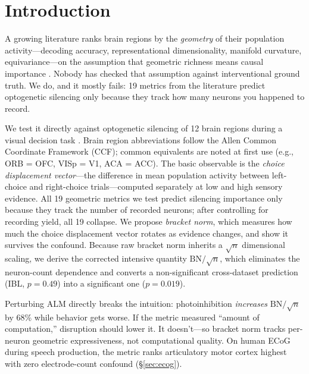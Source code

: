 \documentclass{article}
\begin{document}
\section{Introduction}

A growing literature ranks brain regions by the \emph{geometry} of their population activity---decoding accuracy, representational dimensionality, manifold curvature, equivariance---on the assumption that geometric richness means causal importance \citep{cunningham2014dimensionality, gallego2017neural}. Nobody has checked that assumption against interventional ground truth. We do, and it mostly fails: 19 metrics from the literature predict optogenetic silencing only because they track how many neurons you happened to record.

We test it directly against optogenetic silencing of 12 brain regions during a visual decision task \citep{steinmetz2019distributed, zatkahaas2021}. Brain region abbreviations follow the Allen Common Coordinate Framework (CCF); common equivalents are noted at first use (e.g., ORB = OFC, VISp = V1, ACA = ACC). The basic observable is the \emph{choice displacement vector}---the difference in mean population activity between left-choice and right-choice trials---computed separately at low and high sensory evidence. All 19 geometric metrics we test predict silencing importance only because they track the number of recorded neurons; after controlling for recording yield, all 19 collapse. We propose \emph{bracket norm}, which measures how much the choice displacement vector rotates as evidence changes, and show it survives the confound. Because raw bracket norm inherits a $\sqrt{n}$ dimensional scaling, we derive the corrected intensive quantity $\text{BN}/\!\sqrt{n}$, which eliminates the neuron-count dependence and converts a non-significant cross-dataset prediction (IBL, $p = 0.49$) into a significant one ($p = 0.019$).

Perturbing ALM directly breaks the intuition: photoinhibition \emph{increases} $\text{BN}/\!\sqrt{n}$ by 68\% while behavior gets worse. If the metric measured ``amount of computation,'' disruption should lower it. It doesn't---so bracket norm tracks per-neuron geometric expressiveness, not computational quality. On human ECoG during speech production, the metric ranks articulatory motor cortex highest with zero electrode-count confound (\S\ref{sec:ecog}).
\end{document}
